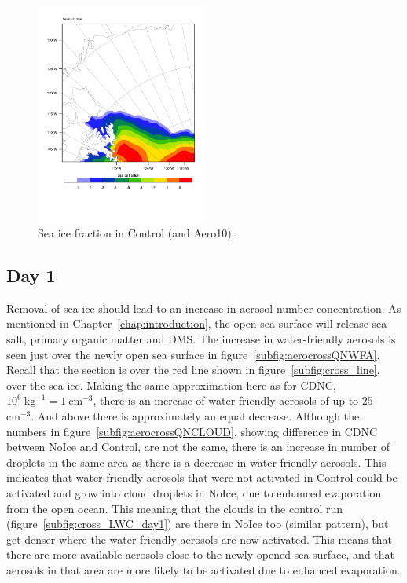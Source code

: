 \begin{figure}[hb]
\centering
\includegraphics[width=0.5\textwidth]{results/control/seaiceplot.pdf}
\caption{Sea ice fraction in Control (and Aero10).}
\label{fig:seaice}
\end{figure}

\subsection{Day 1}
\label{sec:noiceDay1}
Removal of sea ice should lead to an increase in aerosol number concentration. As mentioned in Chapter~\ref{chap:introduction}, the open sea surface will release sea salt, primary organic matter and DMS. The increase in water-friendly aerosols is seen just over the newly open sea surface in figure~\ref{subfig:aerocrossQNWFA}. Recall that the section is over the red line shown in figure~\ref{subfig:cross_line}, over the sea ice. Making the same approximation here as for CDNC, $10^6~\text{kg}^{-1}=1~\text{cm}^{-3}$, there is an increase of water-friendly aerosols of up to 25~$\text{cm}^{-3}$. And above there is approximately an equal decrease. Although the numbers in figure~\ref{subfig:aerocrossQNCLOUD}, showing difference in CDNC between NoIce and Control, are not the same, there is an increase in number of droplets in the same area as there is a decrease in water-friendly aerosols. This indicates that water-friendly aerosols that were not activated in Control could be activated and grow into cloud droplets in NoIce, due to enhanced evaporation from the open ocean. This meaning that the clouds in the control run (figure~\ref{subfig:cross_LWC_day1}) are there in NoIce too (similar pattern), but get denser where the water-friendly aerosols are now activated. This means that there are more available aerosols close to the newly opened sea surface, and that aerosols in that area are more likely to be activated due to enhanced evaporation.

